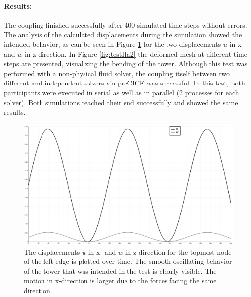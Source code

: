     \paragraph{Results:} The coupling finished successfully after 400 simulated time steps without errors. The analysis of the calculated displacements during the simulation showed the intended behavior, as can be seen in Figure \ref{fig:testHa1} for the two displacements $u$ in x- and $w$ in z-direction. In Figure \ref{fig:testHa2} the deformed mesh at different time steps are presented, visualizing the bending of the tower. Although this test was performed with a non-physical fluid solver, the coupling itself between two different and independent solvers via preCICE was successful. In this test, both participants were executed in serial as well as in parallel (2 processes for each solver). Both simulations reached their end successfully and showed the same results.

	\begin{figure}[htbp]
	 \centering
	 \includegraphics[width=1.0\linewidth]{figures/i-beam_w}
     \caption{The displacements $u$ in x- and $w$ in z-direction for the topmost node of the left edge is plotted over time. The smooth oscillating behavior of the tower that was intended in the test is clearly visible. The motion in x-direction is larger due to the forces facing the same direction.}
	 \label{fig:testHa1}
	\end{figure}    

